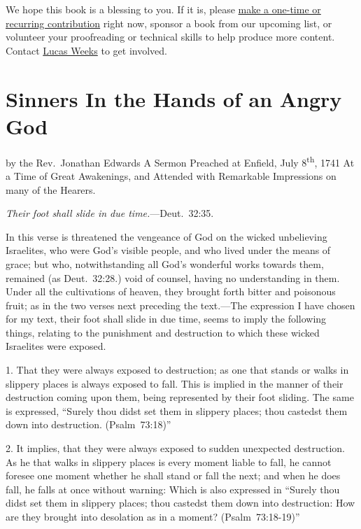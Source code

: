 \documentclass[
]{book}
\begin{document}
We hope this book is a blessing to you. If it is, please \href{https://warhornmedia.com/give}{make a one-time or recurring contribution} right now, sponsor a book from our upcoming list, or volunteer your proofreading or technical skills to help produce more content. Contact \href{mailto:lucas@beggarsborn.com}{Lucas Weeks} to get involved.

\clearpage
\setcounter{page}{1}

\hypertarget{sinners-in-the-hands-of-an-angry-god}{%
\chapter{Sinners In the Hands of an Angry God}\label{sinners-in-the-hands-of-an-angry-god}}

by the Rev.~Jonathan Edwards A Sermon Preached at Enfield, July 8\textsuperscript{th}, 1741 At a Time of Great Awakenings, and Attended with Remarkable Impressions on many of the Hearers.

\emph{Their foot shall slide in due time.}---Deut.~32:35.

In this verse is threatened the vengeance of God on the wicked unbelieving Israelites, who were God's visible people, and who lived under the means of grace; but who, notwithstanding all God's wonderful works towards them, remained (as Deut.~32:28.) void of counsel, having no understanding in them. Under all the cultivations of heaven, they brought forth bitter and poisonous fruit; as in the two verses next preceding the text.---The expression I have chosen for my text, their foot shall slide in due time, seems to imply the following things, relating to the punishment and destruction to which these wicked Israelites were exposed.

1. That they were always exposed to destruction; as one that stands or walks in slippery places is always exposed to fall. This is implied in the manner of their destruction coming upon them, being represented by their foot sliding. The same is expressed, ``Surely thou didst set them in slippery places; thou castedst them down into destruction. (Psalm~73:18)''

2. It implies, that they were always exposed to sudden unexpected destruction. As he that walks in slippery places is every moment liable to fall, he cannot foresee one moment whether he shall stand or fall the next; and when he does fall, he falls at once without warning: Which is also expressed in ``Surely thou didst set them in slippery places; thou castedst them down into destruction: How are they brought into desolation as in a moment? (Psalm~73:18-19)''
\end{document}
